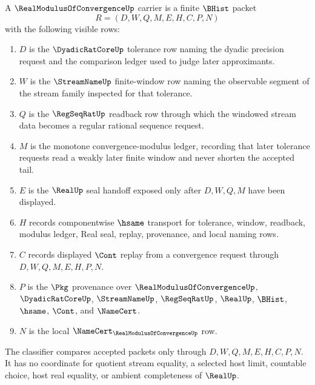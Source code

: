 \begin{definition}
\label{def:real-modulus-of-convergence-carrier}
A $\RealModulusOfConvergenceUp$ carrier is a finite $\BHist$ packet
$$
R=(D,W,Q,M,E,H,C,P,N)
$$
with the following visible rows:
\begin{enumerate}
\item $D$ is the $\DyadicRatCoreUp$ tolerance row naming the dyadic precision request and the comparison ledger used to judge later approximants.
\item $W$ is the $\StreamNameUp$ finite-window row naming the observable segment of the stream family inspected for that tolerance.
\item $Q$ is the $\RegSeqRatUp$ readback row through which the windowed stream data becomes a regular rational sequence request.
\item $M$ is the monotone convergence-modulus ledger, recording that later tolerance requests read a weakly later finite window and never shorten the accepted tail.
\item $E$ is the $\RealUp$ seal handoff exposed only after $D,W,Q,M$ have been displayed.
\item $H$ records componentwise $\hsame$ transport for tolerance, window, readback, modulus ledger, Real seal, replay, provenance, and local naming rows.
\item $C$ records displayed $\Cont$ replay from a convergence request through $D,W,Q,M,E,H,P,N$.
\item $P$ is the $\Pkg$ provenance over $\RealModulusOfConvergenceUp$, $\DyadicRatCoreUp$, $\StreamNameUp$, $\RegSeqRatUp$, $\RealUp$, $\BHist$, $\hsame$, $\Cont$, and $\NameCert$.
\item $N$ is the local $\NameCert_{\RealModulusOfConvergenceUp}$ row.
\end{enumerate}
The classifier compares accepted packets only through $D,W,Q,M,E,H,C,P,N$. It has no coordinate for quotient stream equality, a selected host limit, countable choice, host real equality, or ambient completeness of $\RealUp$.
\end{definition}

